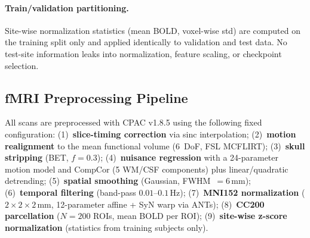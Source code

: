 \documentclass[runningheads]{llncs}
\begin{document}
\paragraph{Train/validation partitioning.}
Site-wise normalization statistics (mean BOLD, voxel-wise std) are computed on the training split only and applied identically to validation and test data. No test-site information leaks into normalization, feature scaling, or checkpoint selection.
\subsection{fMRI Preprocessing Pipeline}
All scans are preprocessed with CPAC v1.8.5 using the following fixed configuration: (1)~\textbf{slice-timing correction} via sinc interpolation; (2)~\textbf{motion realignment} to the mean functional volume (6~DoF, FSL MCFLIRT); (3)~\textbf{skull stripping} (BET, $f{=}0.3$); (4)~\textbf{nuisance regression} with a 24-parameter motion model and CompCor (5 WM/CSF components) plus linear/quadratic detrending; (5)~\textbf{spatial smoothing} (Gaussian, FWHM~$=6$\,mm); (6)~\textbf{temporal filtering} (band-pass $0.01$--$0.1$\,Hz); (7)~\textbf{MNI152 normalization} ($2{\times}2{\times}2$\,mm, 12-parameter affine + SyN warp via ANTs); (8)~\textbf{CC200 parcellation} ($N{=}200$ ROIs, mean BOLD per ROI); (9)~\textbf{site-wise z-score normalization} (statistics from training subjects only).
\end{document}
